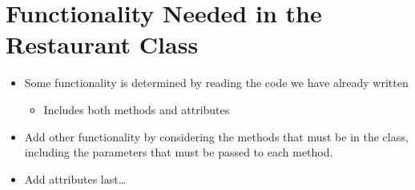 \documentclass[letterpaper,10pt,english]{sphinxmanual}
\begin{document}
\section{Functionality Needed in the Restaurant Class}
\label{\detokenize{lecture_notes/lec19_classes2:functionality-needed-in-the-restaurant-class}}\begin{itemize}
\item {} 
Some functionality is determined by reading the code we have
already written
\begin{itemize}
\item {} 
Includes both methods and attributes

\end{itemize}

\item {} 
Add other functionality by considering the methods that must be in
the  class, including the parameters that must be
passed to each method.

\item {} 
Add attributes last…

\end{itemize}
\end{document}

